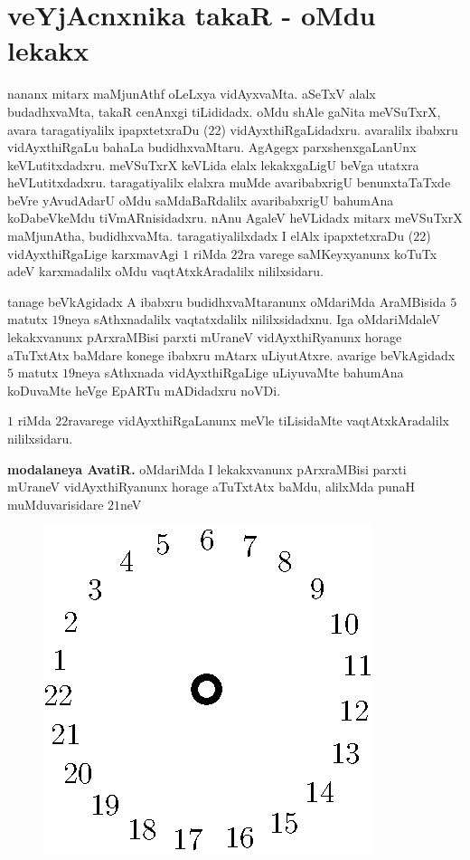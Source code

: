 \chapter{veYjAcnxnika takaR - oMdu lekakx}

nananx mitarx maMjunAthf oLeLxya vidAyxvaMta. aSeTxV alalx budadhxvaMta, takaR cenAnxgi tiLididadx. oMdu shAle gaNita meVSuTxrX, avara taragatiyalilx ipapxtetxraDu ($22$) vidAyxthiRgaLidadxru. avaralilx ibabxru vidAyxthiRgaLu bahaLa budidhxvaMtaru. AgAgegx parxshenxgaLanUnx keVLutitxdadxru. meVSuTxrX keVLida elalx lekakxgaLigU beVga utatxra heVLutitxdadxru. taragatiyalilx elalxra muMde avaribabxrigU benunxtaTaTxde beVre yAvudAdarU oMdu saMdaBaRdalilx avaribabxrigU bahumAna koDabeVkeMdu tiVmARnisidadxru. nAnu AgaleV heVLidadx mitarx meVSuTxrX maMjunAtha, budidhxvaMta. taragatiyalilxdadx I elAlx ipapxtetxraDu ($22$) vidAyxthiRgaLige karxmavAgi $1$ riMda $22$ra varege saMKeyxyanunx koTuTx adeV karxmadalilx oMdu vaqtAtxkAradalilx nililxsidaru.

tanage beVkAgidadx A ibabxru budidhxvaMtaranunx oMdariMda AraMBisida $5$ matutx $19$neya sAthxnadalilx vaqtatxdalilx nililxsidadxnu. Iga oMdariMdaleV lekakxvanunx pArxraMBisi parxti mUraneV vidAyxthiRyanunx horage aTuTxtAtx baMdare konege ibabxru mAtarx uLiyutAtxre. avarige beVkAgidadx $5$ matutx $19$neya sAthxnada vidAyxthiRgaLige uLiyuvaMte bahumAna koDuvaMte heVge EpARTu mADidadxru noVDi.

$1$ riMda $22$ravarege vidAyxthiRgaLanunx meVle tiLisidaMte vaqtAtxkAradalilx nililxsidaru.

{\bf modalaneya AvatiR.} oMdariMda I lekakxvanunx pArxraMBisi parxti mUraneV vidAyxthiRyanunx horage aTuTxtAtx baMdu, alilxMda punaH muMduvarisidare $21$neV
\begin{figure}[H]
\centering
\includegraphics[scale=0.8]{src/figures/fig8.eps}
\end{figure}

